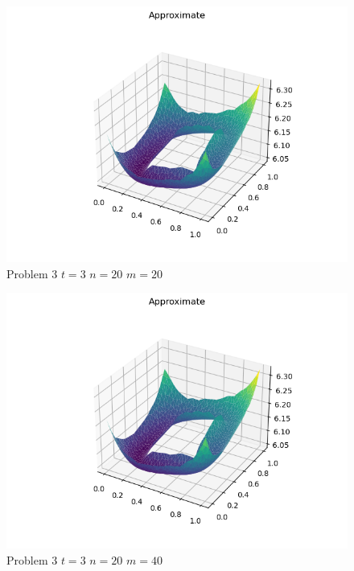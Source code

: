 \documentclass{report}
\begin{document}
\begin{figure}[h]
	\caption{Problem 3 $t = 3$ $n = 20$ $m = 20$}
	\includegraphics[width=\textwidth]{example.png}
\end{figure}
\begin{figure}[h]
	\caption{Problem 3 $t = 3$ $n = 20$ $m = 40$}
	\includegraphics[width=\textwidth]{example.png}
\end{figure}
\end{document}
